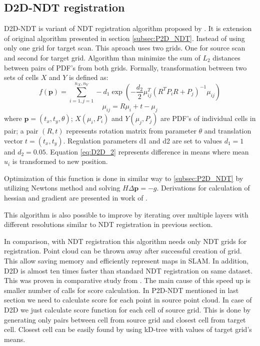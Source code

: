 \subsection{D2D-NDT registration}
\label{subsec:D2D_NDT}
\gls{D2D}-\gls{NDT} is variant of \gls{NDT} registration algorithm proposed by \cite{Stoyanov01102012}. It is extension of original algorithm presented in section \ref{subsec:P2D_NDT}. Instead of using only one grid for target scan. This aproach uses two grids. One for source scan and second for target grid. Algorithm than minimize the sum of $L_{2}$ distances between pairs of \gls{PDF}'s from both grids. Formally, transformation between two sets of cells $X$ and $Y$ is defined as:
\begin{equation}
f(\textbf{p}) = \sum_{i = 1, j =1}^{n_{X}, n_{Y}} -d_{1}\exp\left( - \frac{d_{2}}{2}  \mu_{ij}^{T}(R^{T}P_{i}R + P_{j})^{-1} \mu_{ij} \right)
\end{equation}
\begin{equation}
\label{eq:D2D_2}
\mu_{ij} = R\mu_{i} + t - \mu_{j}
\end{equation}
where $\textbf{p} = (t_{x},t_{y},\theta)$; $X(\mu_{i},P_{i})$ and $Y(\mu_{j}, P_{j})$ are \gls{PDF}'s of individual cells in pair; a pair $(R,t)$ represents rotation matrix from parameter $\theta$ and translation vector $t=(t_{x},t_{y})$. Regulation parameters d1 and d2 are set to values $d_{1} = 1$ and $d_{2}=0.05$. Equation \ref{eq:D2D_2} represents difference in means where mean $u_{i}$ is transformed to new position.

Optimization of this function is done in similar way to \ref{subsec:P2D_NDT}  by utilizing Newtons method and solving $H\varDelta \textbf{p} = -g$. Derivations for calculation of hessian and gradient are presented in work of \cite{Stoyanov01102012}.

This algorithm is also possible to improve by iterating over multiple layers with different resolutions similar to \gls{NDT} registration in previous section.

In comparison, with \gls{NDT} registration this algorithm needs only \gls{NDT} grids for registration. Point cloud can be thrown away after successful creation of grid. This allow saving memory and efficiently represent maps in \gls{SLAM}. In addition, \gls{D2D} is almost ten times faster than standard \gls{NDT} registration on same dataset. This was proven in comparative study from \cite{NDTcomparative}. The main cause of this speed up is smaller number of calls for score calculation. In \gls{P2D}-\gls{NDT} mentioned in last section we need to calculate score for each point in source point cloud. In case of \gls{D2D} we just calculate score function for each cell of source grid. This is done by generating only pairs between cell from source grid and closest cell from target cell. Closest cell can be easily found by using kD-tree with values of target grid's means.
  
